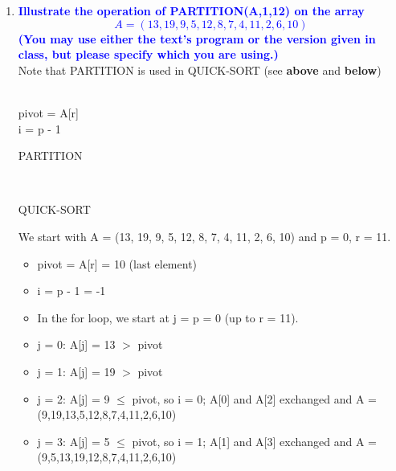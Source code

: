 \documentclass[11pt]{article}
\begin{document}
\begin{enumerate}

\item  \textbf{\textcolor{blue}{Illustrate the operation of PARTITION(A,1,12) on the array 
\[ A=(13,19,9,5,12,8,7,4,11,2,6,10) \] 
(You may use either the text's program or the version given in class, but please specify which you are using.)}}
    \\ Note that PARTITION is used in QUICK-SORT (see \textbf{above} and \textbf{below})
    \begin{algorithm}
        \Indm{} \\
        \Indp
            pivot = A[r] \\
            i = p - 1 \\
        \caption{PARTITION}
    \end{algorithm}
    \begin{algorithm}
        \Indm{} \\
        \Indp
        \caption{QUICK-SORT}
    \end{algorithm}
    We start with A = (13, 19, 9, 5, 12, 8, 7, 4, 11, 2, 6, 10) and p = 0, r = 11.
    \begin{itemize}
        \item pivot = A[r] = 10 (last element)
        \item i = p - 1 = -1
        \item In the for loop, we start at j = p = 0 (up to r = 11).
        \item j = 0: A[j] = 13 $>$ pivot
        \item j = 1: A[j] = 19 $>$ pivot
        \item j = 2: A[j] = 9 $\leq$ pivot, so i = 0; A[0] and A[2] exchanged and A = (9,19,13,5,12,8,7,4,11,2,6,10)
        \item j = 3: A[j] = 5 $\leq$ pivot, so i = 1; A[1] and A[3] exchanged and A = (9,5,13,19,12,8,7,4,11,2,6,10)

\end{itemize}
\end{enumerate}
\end{document}
